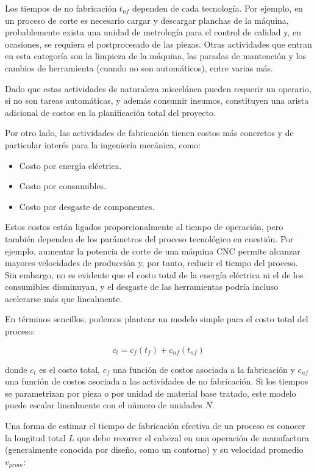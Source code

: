Los tiempos de no fabricación $t_{nf}$ dependen de cada tecnología. Por ejemplo, en un proceso de corte es necesario cargar y descargar planchas de la máquina, probablemente exista una unidad de metrología para el control de calidad y, en ocasiones, se requiera el postprocesado de las piezas. Otras actividades que entran en esta categoría son la limpieza de la máquina, las paradas de mantención y los cambios de herramienta (cuando no son automáticos), entre varias más.

Dado que estas actividades de naturaleza miscelánea pueden requerir un operario, si no son tareas automáticas, y además consumir insumos, constituyen una arista adicional de costos en la planificación total del proyecto.

Por otro lado, las actividades de fabricación tienen costos más concretos y de particular interés para la ingeniería mecánica, como:

\begin{itemize}
	\item Costo por energía eléctrica.
	\item Costo por consumibles.
	\item Costo por desgaste de componentes.
\end{itemize}

Estos costos están ligados proporcionalmente al tiempo de operación, pero también dependen de los parámetros del proceso tecnológico en cuestión. Por ejemplo, aumentar la potencia de corte de una máquina CNC permite alcanzar mayores velocidades de producción y, por tanto, reducir el tiempo del proceso. Sin embargo, no es evidente que el costo total de la energía eléctrica ni el de los consumibles disminuyan, y el desgaste de las herramientas podría incluso acelerarse más que linealmente.

En términos sencillos, podemos plantear un modelo simple para el costo total del proceso:

\begin{equation}
	c_{t}=c_{f}(t_{f})+c_{nf}(t_{nf})
	\label{eq:costo_total}
\end{equation}

donde $c_{t}$ es el costo total, $c_{f}$ una función de costos asociada a la fabricación y $c_{nf}$ una función de costos asociada a las actividades de no fabricación. Si los tiempos se parametrizan por pieza o por unidad de material base tratado, este modelo puede escalar linealmente con el número de unidades $N$.

Una forma de estimar el tiempo de fabricación efectiva de un proceso es conocer la longitud total $L$ que debe recorrer el cabezal en una operación de manufactura (generalmente conocida por diseño, como un contorno) y su velocidad promedio $v_{prom}$:

